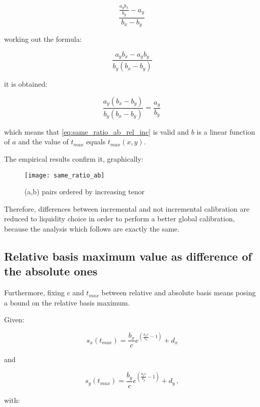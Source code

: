 \begin{equation*}
    \frac{\frac{a_{y}b_{x}}{b_{y}}-a_{y}}{b_{x}-b_{y}}\,
\end{equation*}

working out the formula:

\begin{equation*}
    \frac{a_{y}b_{x}-a_{y}b_{y}}{b_{y}(b_{x}-b_{y})}
\end{equation*}

it is obtained:

\begin{equation*}
    \frac{a_{y}(b_{x}-b_{y})}{b_{y}(b_{x}-b_{y})}= \frac{a_{y}}{b_{y}}\,
\end{equation*}

which means that \eqref{eq:same_ratio_ab_rel_inc} is valid and $b$ is a linear function of $a$ and the value of $t_{max}$ equals $t_{max}(x,y)$. 

The empirical results confirm it, graphically:

\begin{figure}[H]
\centering
\texttt{[image: same\_ratio\_ab]}
\caption{(a,b) pairs ordered by increasing tenor}
\label{fig:same_ratio_ab}
\end{figure}

Therefore, differences between incremental and not incremental calibration are reduced to liquidity choice in order to perform a better global calibration, because the analysis which follows are exactly the same.

\subsection{Relative basis maximum value as difference of the absolute ones}

Furthermore, fixing $c$ and $t_{max}$ between relative and absolute basis means posing a bound on the relative basis maximum. 

Given:

\begin{equation*}
    s_{x}(t_{max})=\frac{b_{x}}{c} e^{(\frac{a_{x}c}{b_{x}}-1)} +d_{x}
\end{equation*}

and

\begin{equation*}
    s_{y}(t_{max})=\frac{b_{y}}{c} e^{(\frac{a_{y}c}{b_{y}}-1)} +d_{y}\,,
\end{equation*}

with:

